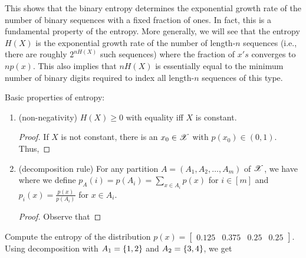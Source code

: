 \documentclass[letterpaper,10pt,english]{article}
\begin{document}
\begin{rem} 
This shows that the binary entropy determines the exponential growth rate of the number of binary sequences with a fixed fraction of ones. 
In fact, this is a fundamental property of the entropy. 
More generally, we will see that the entropy $H (X)$ is the exponential growth rate of the number of length-$n$ sequences (i.e., there are roughly $2^{nH(X)}$ such sequences) where the fraction of $x's$ converges to $np(x)$. 
This also implies that $nH (X)$ is essentially equal to the minimum number of binary digits required to index all length-$n$ sequences of this type. 
\end{rem}
\begin{lem} 
Basic properties of entropy:
\begin{enumerate}
\item (non-negativity) $H (X) \ge 0$ with equality iff $X$ is constant. 
\begin{proof} 
If $X$ is not constant, there is an $x_0 \in \mathscr{X}$ with $p(x_0) \in (0,1)$. 
Thus, 
\end{proof}
\item (decomposition rule) For any partition $A = (A_1, A_2, \dots, A_m)$ of $\mathscr{X}$, we have 
where we define $p_A(i) = p(A_i) = \sum_{x \in A_i} p(x)$ for $i \in [m]$ and $p_i(x) = \frac{p(x)}{p(A_i)}$ for $x \in A_i$.
\begin{proof}
Observe that
\end{proof}
\end{enumerate}
\end{lem}
\begin{exmp} 
Compute the entropy of the distribution $p(x) = \begin{bmatrix}0.125  & 0.375 & 0.25 &0.25\end{bmatrix}$. Using decomposition with $A_1 = \left\{1, 2\right\}$ and $A_2 = \left\{3, 4\right\}$, we get 
\end{exmp}
\end{document}
